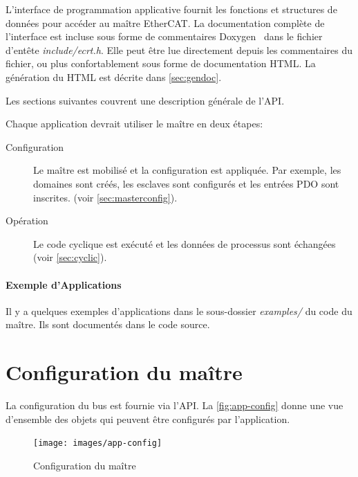 \documentclass[a4paper,12pt,BCOR=6mm,bibtotoc,idxtotoc]{scrbook}
\begin{document}
L'interface de programmation applicative fournit les fonctions et
structures de donn\'ees pour acc\'eder au ma\^itre EtherCAT.  La
documentation compl\`ete de l'interface est incluse sous forme de
commentaires Doxygen~\cite{doxygen} dans le fichier d'ent\^ete
\textit{include/ecrt.h}. Elle peut \^etre lue directement depuis les
commentaires du fichier, ou plus confortablement sous forme de
documentation HTML. La g\'en\'eration du HTML est d\'ecrite dans
\autoref{sec:gendoc}.

Les sections suivantes couvrent une description g\'en\'erale de l'API.

Chaque application devrait utiliser le ma\^itre en deux \'etapes:

\begin{description}

\item[Configuration] Le ma\^itre est mobilis\'e et la configuration
  est appliqu\'ee. Par exemple, les domaines sont cr\'e\'es, les
  esclaves sont configur\'es et les entr\'ees PDO sont inscrites.
  (voir \autoref{sec:masterconfig}).

\item[Op\'eration] Le code cyclique est ex\'ecut\'e et les donn\'ees de
  processus sont \'echang\'ees (voir \autoref{sec:cyclic}).

\end{description}

\paragraph{Exemple d'Applications}
Il y a quelques exemples d'applications dans le sous-dossier
\textit{examples/} du code du ma\^itre. Ils sont document\'es dans le
code source.


\section{Configuration du ma\^itre}
\label{sec:masterconfig}

La configuration du bus est fournie via l'API. La
\autoref{fig:app-config} donne une vue d'ensemble des objets qui
peuvent \^etre configur\'es par l'application.

\begin{figure}[htbp]
  \centering
  \texttt{[image: images/app-config]}
  \caption{Configuration du ma\^itre}
  \label{fig:app-config}
\end{figure}
\end{document}
